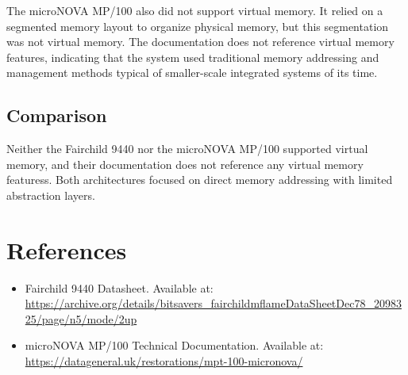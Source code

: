 \documentclass[a4paper,12pt]{article}
\begin{document}
The microNOVA MP/100 also did not support virtual memory. It relied on a segmented memory layout to organize physical memory, but this segmentation was not virtual memory. The documentation does not reference virtual memory features, indicating that the system used traditional memory addressing and management methods typical of smaller-scale integrated systems of its time.

\subsection{Comparison}

Neither the Fairchild 9440 nor the microNOVA MP/100 supported virtual memory, and their documentation does not reference any virtual memory featuress. Both architectures focused on direct memory addressing with limited abstraction layers.

\section*{References}

\begin{itemize}
    \item Fairchild 9440 Datasheet. Available at: \url{https://archive.org/details/bitsavers_fairchildmflameDataSheetDec78_2098325/page/n5/mode/2up}
    \item microNOVA MP/100 Technical Documentation. Available at: \url{https://datageneral.uk/restorations/mpt-100-micronova/}
\end{itemize}
\end{document}
